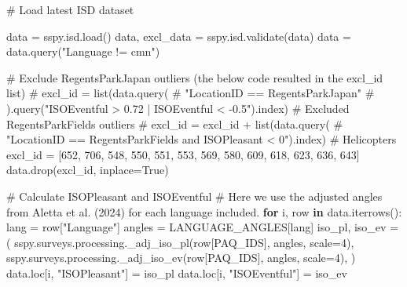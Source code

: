 \documentclass[
  authoryear,
  preprint,
  3p]{elsarticle}
\newenvironment{Shaded}{\begin{snugshade}}{\end{snugshade}}
\newcommand{\CommentTok}[1]{\textcolor[rgb]{0.37,0.37,0.37}{#1}}
\newcommand{\ControlFlowTok}[1]{\textcolor[rgb]{0.00,0.23,0.31}{\textbf{#1}}}
\newcommand{\DecValTok}[1]{\textcolor[rgb]{0.68,0.00,0.00}{#1}}
\newcommand{\KeywordTok}[1]{\textcolor[rgb]{0.00,0.23,0.31}{\textbf{#1}}}
\newcommand{\NormalTok}[1]{\textcolor[rgb]{0.00,0.23,0.31}{#1}}
\newcommand{\OperatorTok}[1]{\textcolor[rgb]{0.37,0.37,0.37}{#1}}
\newcommand{\StringTok}[1]{\textcolor[rgb]{0.13,0.47,0.30}{#1}}
\newcommand{\VariableTok}[1]{\textcolor[rgb]{0.07,0.07,0.07}{#1}}
\begin{document}
\begin{Shaded}
\begin{Highlighting}[]
\CommentTok{\# Load latest ISD dataset}

\NormalTok{data }\OperatorTok{=}\NormalTok{ sspy.isd.load()}
\NormalTok{data, excl\_data }\OperatorTok{=}\NormalTok{ sspy.isd.validate(data)}
\NormalTok{data }\OperatorTok{=}\NormalTok{ data.query(}\StringTok{"Language != \textquotesingle{}cmn\textquotesingle{}"}\NormalTok{)}

\CommentTok{\# Exclude RegentsParkJapan outliers (the below code resulted in the \textasciigrave{}excl\_id\textasciigrave{} list)}
\CommentTok{\# excl\_id = list(data.query(}
    \CommentTok{\# "LocationID == \textquotesingle{}RegentsParkJapan\textquotesingle{}"}
    \CommentTok{\# ).query("ISOEventful \textgreater{} 0.72 | ISOEventful \textless{} {-}0.5").index)}
\CommentTok{\# Excluded RegentsParkFields outliers}
\CommentTok{\# excl\_id = excl\_id + list(data.query(}
    \CommentTok{\# "LocationID == \textquotesingle{}RegentsParkFields\textquotesingle{} and ISOPleasant \textless{} 0").index) \# Helicopters}
\NormalTok{excl\_id }\OperatorTok{=}\NormalTok{ [}\DecValTok{652}\NormalTok{, }\DecValTok{706}\NormalTok{, }\DecValTok{548}\NormalTok{, }\DecValTok{550}\NormalTok{, }\DecValTok{551}\NormalTok{, }\DecValTok{553}\NormalTok{, }\DecValTok{569}\NormalTok{, }\DecValTok{580}\NormalTok{, }\DecValTok{609}\NormalTok{, }\DecValTok{618}\NormalTok{, }\DecValTok{623}\NormalTok{, }\DecValTok{636}\NormalTok{, }\DecValTok{643}\NormalTok{]}
\NormalTok{data.drop(excl\_id, inplace}\OperatorTok{=}\VariableTok{True}\NormalTok{)}

\CommentTok{\# Calculate ISOPleasant and ISOEventful}
\CommentTok{\# Here we use the adjusted angles from Aletta et al. (2024) for each language included.}
\ControlFlowTok{for}\NormalTok{ i, row }\KeywordTok{in}\NormalTok{ data.iterrows():}
\NormalTok{    lang }\OperatorTok{=}\NormalTok{ row[}\StringTok{"Language"}\NormalTok{]}
\NormalTok{    angles }\OperatorTok{=}\NormalTok{ LANGUAGE\_ANGLES[lang]}
\NormalTok{    iso\_pl, iso\_ev }\OperatorTok{=}\NormalTok{ (}
\NormalTok{        sspy.surveys.processing.\_adj\_iso\_pl(row[PAQ\_IDS], angles, scale}\OperatorTok{=}\DecValTok{4}\NormalTok{),}
\NormalTok{        sspy.surveys.processing.\_adj\_iso\_ev(row[PAQ\_IDS], angles, scale}\OperatorTok{=}\DecValTok{4}\NormalTok{),}
\NormalTok{    )}
\NormalTok{    data.loc[i, }\StringTok{"ISOPleasant"}\NormalTok{] }\OperatorTok{=}\NormalTok{ iso\_pl}
\NormalTok{    data.loc[i, }\StringTok{"ISOEventful"}\NormalTok{] }\OperatorTok{=}\NormalTok{ iso\_ev}
\end{Highlighting}
\end{Shaded}
\end{document}
